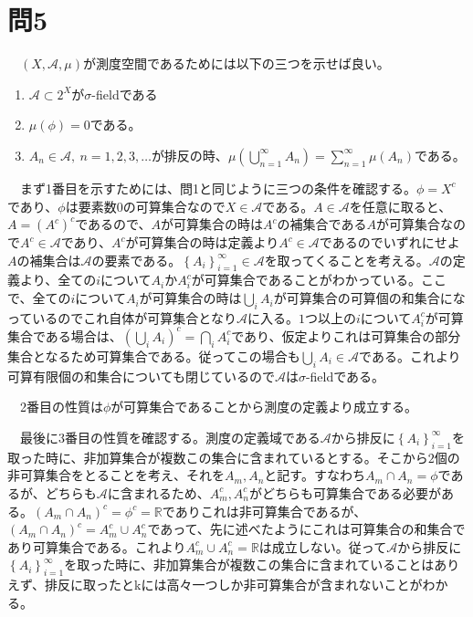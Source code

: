 \documentclass{article}
\begin{document}
\section{問5}
　$\left( X, \mathcal{A}, \mu \right)$が測度空間であるためには以下の三つを示せば良い。
\begin{enumerate}
	\item $\mathcal{A} \subset 2^X$が$\sigma$-fieldである
	\item $\mu(\phi) = 0$である。
	\item $A_n \in \mathcal{A},\ n = 1,2,3,\dots$が排反の時、$\mu\left( \bigcup_{n = 1}^{\infty} A_n \right) = \sum_{n = 1}^{\infty} \mu\left( A_n \right)$である。
\end{enumerate}

　まず1番目を示すためには、問1と同じように三つの条件を確認する。$\phi = X^c$であり、$\phi$は要素数$0$の可算集合なので$X \in \mathcal{A}$である。$A \in \mathcal{A}$を任意に取ると、$A = (A^c)^c$であるので、$A$が可算集合の時は$A^c$の補集合である$A$が可算集合なので$A^c \in \mathcal{A}$であり、$A^c$が可算集合の時は定義より$A^c \in \mathcal{A}$であるのでいずれにせよ$A$の補集合は$\mathcal{A}$の要素である。$\left\{ A_i \right\}_{i = 1}^{\infty} \in \mathcal{A}$を取ってくることを考える。$\mathcal{A}$の定義より、全ての$i$について$A_i$か$A_i^c$が可算集合であることがわかっている。ここで、全ての$i$について$A_i$が可算集合の時は$\bigcup_i A_i$が可算集合の可算個の和集合になっているのでこれ自体が可算集合となり$\mathcal{A}$に入る。$1$つ以上の$i$について$A_i^c$が可算集合である場合は、$\left( \bigcup_i A_i\right)^c = \bigcap_i A_i^c$であり、仮定よりこれは可算集合の部分集合となるため可算集合である。従ってこの場合も$ \bigcup_i A_i \in \mathcal{A}$である。これより可算有限個の和集合についても閉じているので$\mathcal{A}$は$\sigma$-fieldである。

　2番目の性質は$\phi$が可算集合であることから測度の定義より成立する。

　最後に3番目の性質を確認する。測度の定義域である$\mathcal{A}$から排反に$\left\{ A_i \right\}_{i = 1}^{\infty}$を取った時に、非加算集合が複数この集合に含まれているとする。そこから$2$個の非可算集合をとることを考え、それを$A_m, A_n$と記す。すなわち$A_m \cap A_n = \phi$であるが、どちらも$\mathcal{A}$に含まれるため、$A_m^c, A_n^c$がどちらも可算集合である必要がある。$\left( A_m \cap A_n \right)^c = \phi^c = \mathbb{R}$でありこれは非可算集合であるが、$\left( A_m \cap A_n \right)^c = A_m^c \cup A_n^c$であって、先に述べたようにこれは可算集合の和集合であり可算集合である。これより$A_m^c \cup A_n^c = \mathbb{R}$は成立しない。従って$\mathcal{A}$から排反に$\left\{ A_i \right\}_{i = 1}^{\infty}$を取った時に、非加算集合が複数この集合に含まれていることはありえず、排反に取ったとkには高々一つしか非可算集合が含まれないことがわかる。
\end{document}
